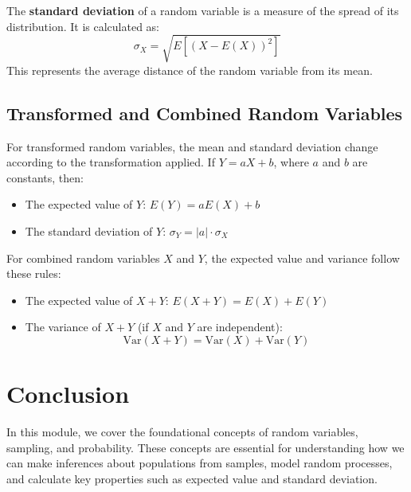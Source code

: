 \documentclass{article}
\begin{document}
The \textbf{standard deviation} of a random variable is a measure of the spread of its distribution. It is calculated as:
\[
\sigma_X = \sqrt{E\left[(X - E(X))^2\right]}
\]
This represents the average distance of the random variable from its mean.

\subsection*{Transformed and Combined Random Variables}
For transformed random variables, the mean and standard deviation change according to the transformation applied. If $Y = aX + b$, where $a$ and $b$ are constants, then:
\begin{itemize}
    \item The expected value of $Y$: $E(Y) = aE(X) + b$
    \item The standard deviation of $Y$: $\sigma_Y = |a| \cdot \sigma_X$
\end{itemize}

For combined random variables $X$ and $Y$, the expected value and variance follow these rules:
\begin{itemize}
    \item The expected value of $X + Y$: $E(X + Y) = E(X) + E(Y)$
    \item The variance of $X + Y$ (if $X$ and $Y$ are independent): 
    \[
    \text{Var}(X + Y) = \text{Var}(X) + \text{Var}(Y)
    \]
\end{itemize}

\section*{Conclusion}

In this module, we cover the foundational concepts of random variables, sampling, and probability. These concepts are essential for understanding how we can make inferences about populations from samples, model random processes, and calculate key properties such as expected value and standard deviation.
\end{document}
